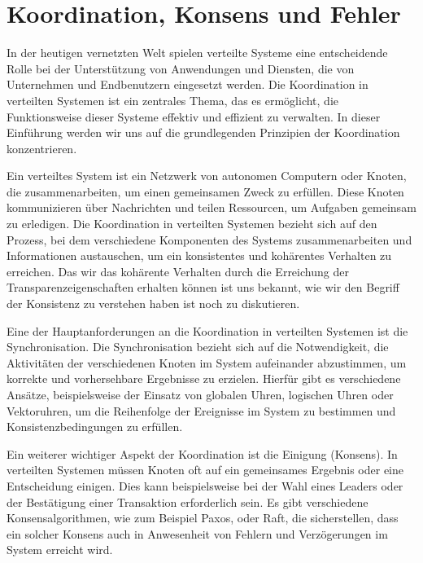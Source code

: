 \documentclass[../vs-script-first-v01.tex]{subfiles}
\begin{document}
\section{Koordination, Konsens und Fehler}

In der heutigen vernetzten Welt spielen verteilte Systeme eine entscheidende Rolle bei der Unterstützung von Anwendungen und Diensten, die von Unternehmen und Endbenutzern eingesetzt werden. Die Koordination in verteilten Systemen ist ein zentrales Thema, das es ermöglicht, die Funktionsweise dieser Systeme effektiv und effizient zu verwalten. In dieser Einführung werden wir uns auf die grundlegenden Prinzipien der Koordination konzentrieren.

Ein verteiltes System ist ein Netzwerk von autonomen Computern oder Knoten, die zusammenarbeiten, um einen gemeinsamen Zweck zu erfüllen. Diese Knoten kommunizieren über Nachrichten und teilen Ressourcen, um Aufgaben gemeinsam zu erledigen. Die Koordination in verteilten Systemen bezieht sich auf den Prozess, bei dem verschiedene Komponenten des Systems zusammenarbeiten und Informationen austauschen, um ein konsistentes und kohärentes Verhalten zu erreichen. Das wir das kohärente Verhalten durch die Erreichung der Transparenzeigenschaften erhalten können ist uns bekannt, wie wir den Begriff der Konsistenz zu verstehen haben ist noch zu diskutieren. 

Eine der Hauptanforderungen an die Koordination in verteilten Systemen ist die Synchronisation. Die Synchronisation bezieht sich auf die Notwendigkeit, die Aktivitäten der verschiedenen Knoten im System aufeinander abzustimmen, um korrekte und vorhersehbare Ergebnisse zu erzielen. Hierfür gibt es verschiedene Ansätze, beispielsweise der Einsatz von globalen Uhren, logischen Uhren oder Vektoruhren, um die Reihenfolge der Ereignisse im System zu bestimmen und Konsistenzbedingungen zu erfüllen.

Ein weiterer wichtiger Aspekt der Koordination ist die Einigung (Konsens). In verteilten Systemen müssen Knoten oft auf ein gemeinsames Ergebnis oder eine Entscheidung einigen. Dies kann beispielsweise bei der Wahl eines Leaders oder der Bestätigung einer Transaktion erforderlich sein. Es gibt verschiedene Konsensalgorithmen, wie zum Beispiel Paxos, oder Raft, die sicherstellen, dass ein solcher Konsens auch in Anwesenheit von Fehlern und Verzögerungen im System erreicht wird.
\end{document}

